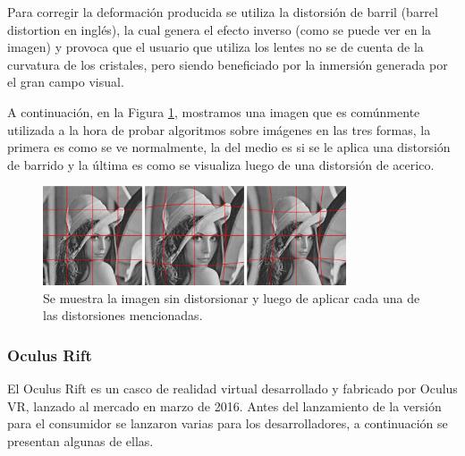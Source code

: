 \documentclass[12pt]{article}
\begin{document}
Para corregir la deformación producida se utiliza la distorsión de barril (barrel distortion en inglés), la cual genera el efecto inverso (como se puede ver en la imagen) y provoca que el usuario que utiliza los lentes no se de cuenta de la curvatura de los cristales, pero siendo beneficiado por la inmersión generada por el gran campo visual\cite{oculusrendering}. 

A continuación, en la Figura \ref{lenna}, mostramos una imagen que es comúnmente utilizada a la hora de probar algoritmos sobre imágenes en las tres formas, la primera es como se ve normalmente, la del medio es si se le aplica una distorsión de barrido y la última es como se visualiza luego de una distorsión de acerico.
\begin{figure}[h!]
\includegraphics[width=0.8\textwidth, center]{imagen_clasica.png}
\caption{Se muestra la imagen sin distorsionar y luego de aplicar cada una de las distorsiones mencionadas.}
\label{lenna}
\end{figure}

\subsubsection{ Oculus Rift}
El Oculus Rift es un casco de realidad virtual desarrollado y fabricado por Oculus VR, lanzado al mercado en marzo de 2016. Antes del lanzamiento de la versión para el consumidor se lanzaron varias para los desarrolladores, a continuación se presentan algunas de ellas\cite{oculus}.
\end{document}
